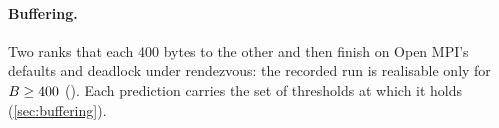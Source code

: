 \paragraph{Buffering.} Two ranks that each  400 bytes to the other and then
 finish on Open MPI's defaults and deadlock under rendezvous: the recorded run
is realisable only for $B \ge 400$ (). Each prediction carries the set of
thresholds at which it holds (\cref{sec:buffering}).
